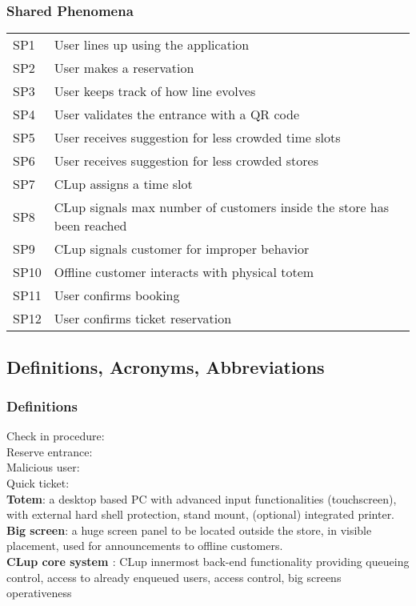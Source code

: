 \subsubsection{Shared Phenomena}
\begin{tabular}{l|l}
	SP1 & User lines up using the application \\
	SP2 & User makes a reservation \\
	SP3 & User keeps track of how line evolves \\
	SP4 & User validates the entrance with a QR code \\
	SP5 & User receives suggestion for less crowded time slots \\
	SP6 & User receives suggestion for less crowded stores \\
	SP7 & CLup assigns a time slot \\
	SP8 & CLup signals max number of customers inside the store has been reached \\
	SP9 & CLup signals customer for improper behavior \\
	SP10 & Offline customer interacts with physical totem \\
	SP11 & User confirms booking \\
	SP12 & User confirms ticket reservation \\
	
\end{tabular}

\subsection{Definitions, Acronyms, Abbreviations}

\subsubsection{Definitions}
Check in procedure:\\
Reserve entrance:\\
Malicious user:\\
Quick ticket:\\
\textbf{Totem}: a desktop based PC with advanced input functionalities (touchscreen), with external hard shell protection, stand mount, (optional) integrated printer.\\
\textbf{Big screen}: a huge screen panel to be located outside the store, in visible placement, used for announcements to offline customers.\\
\textbf{CLup core system \label{core_functionality}}: CLup innermost back-end functionality providing queueing control, access to already enqueued users, access control, big screens operativeness

